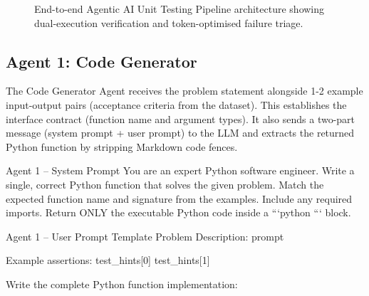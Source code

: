 \documentclass[12pt, a4paper]{article}
\begin{document}
\begin{figure}[H]
\caption{End-to-end Agentic AI Unit Testing Pipeline architecture showing dual-execution verification and token-optimised failure triage.}
\label{fig:pipeline}
\end{figure}

\subsection{Agent 1: Code Generator}

The Code Generator Agent receives the problem statement alongside 1-2 example input-output pairs (acceptance criteria from the dataset). This establishes the interface contract (function name and argument types). It also sends a two-part message (system prompt + user prompt) to the LLM and extracts
the returned Python function by stripping Markdown code fences.

\begin{promptbox}{Agent 1 -- System Prompt}
You are an expert Python software engineer.
Write a single, correct Python function that solves the given problem.
Match the expected function name and signature from the examples.
Include any required imports.
Return ONLY the executable Python code inside a ```python ``` block.
\end{promptbox}

\begin{promptbox}{Agent 1 -- User Prompt Template}
Problem Description:
{prompt}

Example assertions:
{test_hints[0]}
{test_hints[1]}

Write the complete Python function implementation:
\end{promptbox}
\end{document}
